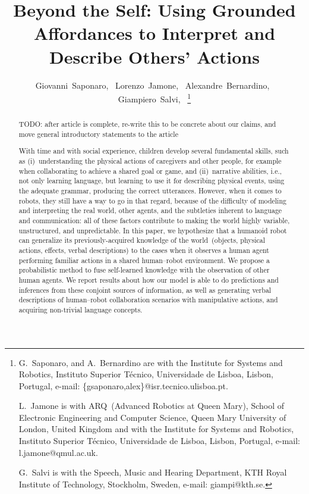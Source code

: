 \documentclass[journal]{IEEEtran}
\newcommand{\hr}{human--robot}
\begin{document}
\title{Beyond the Self: Using Grounded Affordances to Interpret and Describe Others' Actions}

\author{Giovanni~Saponaro,~
        Lorenzo~Jamone,~
        Alexandre~Bernardino,~
        Giampiero~Salvi,~
\thanks{G.~Saponaro, and A.~Bernardino are with the
Institute for Systems and Robotics, Instituto Superior Técnico,
Universidade de Lisboa, Lisbon, Portugal, e-mail: \{gsaponaro,alex\}@isr.tecnico.ulisboa.pt.

L.~Jamone is with ARQ~(Advanced Robotics at Queen Mary), School of Electronic Engineering and Computer Science, Queen Mary University of London, United Kingdom
and with the
Institute for Systems and Robotics, Instituto Superior Técnico, Universidade de Lisboa, Lisbon, Portugal,
e-mail: l.jamone@qmul.ac.uk.

G.~Salvi is with the Speech, Music and Hearing Department,
KTH Royal Institute of Technology, Stockholm, Sweden,
e-mail: giampi@kth.se.
}}

\maketitle
\IEEEpeerreviewmaketitle

\begin{abstract}
TODO: after article is complete, re-write this to be concrete about our claims, and move general introductory statements to the article

With time and with social experience, children develop several fundamental skills, such as
(i)~understanding the physical actions of caregivers and other people, for example when collaborating to achieve a shared goal or game, and
(ii)~narrative abilities, i.e., not only learning language, but learning to use it for describing physical events, using the adequate grammar, producing the correct utterances.
However, when it comes to robots, they still have a way to go in that regard, because of the difficulty of modeling and interpreting the real world, other agents, and the subtleties inherent to language and communication: all of these factors contribute to making the world highly variable, unstructured, and unpredictable.
In this paper, we hypothesize that a humanoid robot can generalize its previously-acquired knowledge of the world~(objects, physical actions, effects, verbal descriptions) to the cases when it observes a human agent performing familiar actions in a shared \hr{} environment.
We propose a probabilistic method to fuse self-learned knowledge with the observation of other human agents.
We report results about how our model is able to do predictions and inferences from these conjoint sources of information, as well as generating verbal descriptions of \hr{} collaboration scenarios with manipulative actions, and acquiring non-trivial language concepts.
\end{abstract}
\end{document}
